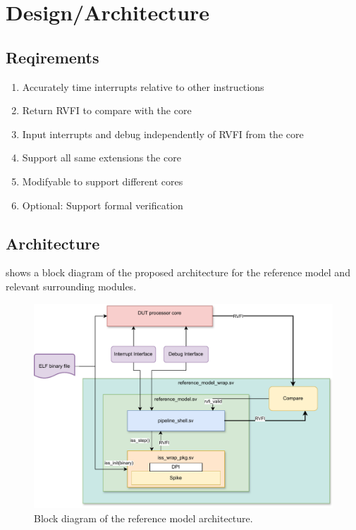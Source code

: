 \chapter{Design/Architecture }

\section{Reqirements}


\begin{enumerate}
    \item Accurately time interrupts relative to other instructions
    \item Return RVFI to compare with the core
    \item Input interrupts and debug independently of RVFI from the core
    \item Support all same extensions the core  \textbf{}
    \item Modifyable to support different cores \textbf{}
    \item Optional: Support formal verification
    
\end{enumerate}




\section{Architecture}


 shows a block diagram of the proposed architecture for the reference model and relevant surrounding modules.



\begin{figure}[hbt]
    \centering
    \includegraphics[width=0.75\linewidth]{figures/Architecture.pdf}
    \caption{Block diagram of the reference model architecture.}
    \label{fig:architecture}
\end{figure}


